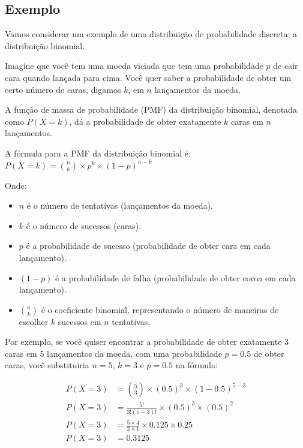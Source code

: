 \begin{apendicesenv}
	\section{Exemplo}

	\par Vamos considerar um exemplo de uma distribuição de probabilidade discreta: a distribuição binomial.
	
	\par Imagine que você tem uma moeda viciada que tem uma probabilidade $ p $ de cair cara quando lançada para cima. Você quer saber a probabilidade de obter um certo número de caras, digamos $ k $, em $ n $ lançamentos da moeda.
	
	\par A função de massa de probabilidade (PMF) da distribuição binomial, denotada como $ P(X = k) $, dá a probabilidade de obter exatamente $ k $ caras em $ n $ lançamentos.
	
	\par A fórmula para a PMF da distribuição binomial é: $ P(X = k) = \binom{n}{k} \times p^k \times (1 - p)^{n - k} $
	
	\par Onde:
	\begin{itemize}
		\item $ n $ é o número de tentativas (lançamentos da moeda).
		\item $ k $ é o número de sucessos (caras).
		\item $ p $ é a probabilidade de sucesso (probabilidade de obter cara em cada lançamento).
		\item $ (1 - p) $ é a probabilidade de falha (probabilidade de obter coroa em cada lançamento).
		\item $ \binom{n}{k} $ é o coeficiente binomial, representando o número de maneiras de escolher $ k $ sucessos em $ n $ tentativas.
	\end{itemize}

	\par Por exemplo, se você quiser encontrar a probabilidade de obter exatamente 3 caras em 5 lançamentos da moeda, com uma probabilidade $ p = 0.5 $ de obter caras, você substituiria $ n = 5 $, $ k = 3 $ e $ p = 0.5 $ na fórmula:
	
	\begin{equation}
		\begin{aligned}
			P(X = 3) &= \binom{5}{3} \times (0.5)^3 \times (1 - 0.5)^{5 - 3} \\
			P(X = 3) &= \frac{5!}{3!(5-3)!} \times (0.5)^3 \times (0.5)^2 \\
			P(X = 3) &= \frac{5 \times 4}{2 \times 1} \times 0.125 \times 0.25 \\
			P(X = 3) &= 0.3125
		\end{aligned}
	\end{equation}
	

\end{apendicesenv}
